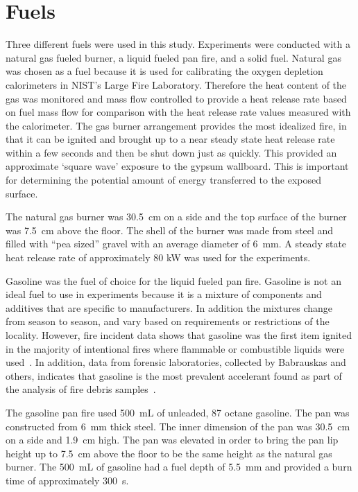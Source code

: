\documentclass[twoside]{uocthesis}
\begin{document}
{\section{Fuels}

Three different fuels were used in this study.  Experiments were conducted with a natural gas fueled burner, a liquid fueled pan fire, and a solid fuel. Natural gas was chosen as a fuel because it is used for calibrating the oxygen depletion calorimeters in NIST’s Large Fire Laboratory.  Therefore the heat content of the gas was monitored and mass flow controlled to provide a heat release rate based on fuel mass flow for comparison with the heat release rate values measured with the calorimeter.  The gas burner arrangement provides the most idealized fire, in that it can be ignited and brought up to a near steady state heat release rate within a few seconds and then be shut down just as quickly.  This provided an approximate `square wave' exposure to the gypsum wallboard.  This is important for determining the potential amount of energy transferred to the exposed surface.

The natural gas burner was 30.5~cm on a side and the top surface of the burner was 7.5~cm above the floor. The shell of the burner was made from steel and filled with ``pea sized'' gravel with an average diameter of 6~mm.  A steady state heat release rate of approximately 80 kW was used for the experiments.

Gasoline was the fuel of choice for the liquid fueled pan fire.  Gasoline is not an ideal fuel to use in experiments because it is a mixture of components and additives that are specific to manufacturers. In addition the mixtures change from season to season, and vary based on requirements or restrictions of the locality.  However, fire incident data shows that gasoline was the first item ignited in the majority of intentional fires where flammable or combustible liquids were used~\cite{Rohr:2001}. In addition, data from forensic laboratories, collected by Babrauskas and others, indicates that gasoline is the most prevalent accelerant found as part of the analysis of fire debris samples~\cite{Babrauskas:2003,Chasteen:2010}.

The gasoline pan fire used 500~mL of unleaded, 87 octane gasoline.  The pan was constructed from 6~mm thick steel.  The inner dimension of the pan was 30.5~cm on a side and 1.9~cm high.  The pan was elevated in order to bring the pan lip height up to 7.5~cm above the floor to be the same height as the natural gas burner.  The 500~mL of gasoline had a fuel depth of 5.5~mm and provided a burn time of approximately 300~s.

}
\end{document}
